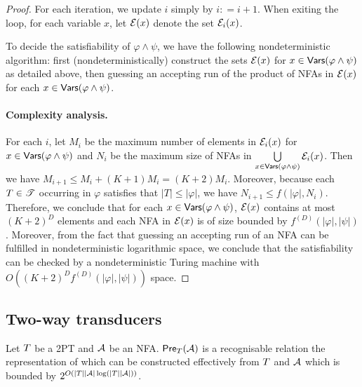 \begin{proof}
For each iteration, we update $i$ simply by  $i: = i+1$.
%
When exiting the loop, for each variable $x$, let $\mathcal{E}(x)$ denote the set $\mathcal{E}_i(x)$.

To decide the satisfiability of $\varphi \wedge \psi$, we have the following nondeterministic algorithm: first (nondeterministically) construct the sets $\mathcal{E}(x)$ for $x \in \mathsf{Vars}(\varphi \wedge \psi)$ as detailed above, then 
guessing an accepting run of the product of NFAs in $\mathcal{E}(x)$ for each $x \in \mathsf{Vars}(\varphi \wedge \psi)$.


\paragraph{Complexity analysis.} For each $i$, let $M_i$ be the maximum number of elements in $\mathcal{E}_i(x)$ for $x  \in \mathsf{Vars}(\varphi \wedge \psi)$ and $N_i$ be the maximum size of NFAs in $\bigcup \limits_{x \in \mathsf{Vars}(\varphi \wedge \psi)} \mathcal{E}_i(x)$. Then we have $M_{i+1} \le M_i + (K+1)M_i = (K+2) M_i$. Moreover,  because each $T \in \mathscr{T}$ occurring in $\varphi$ satisfies that $|T| \le |\varphi|$, we have $N_{i+1} \le f(|\varphi|, N_i)$. Therefore, we conclude that for each $x \in \mathsf{Vars}(\varphi \wedge \psi)$, $\mathcal{E}(x)$ contains at most $(K+2)^D$ elements and each NFA in $\mathcal{E}(x)$ is of size bounded by $f^{(D)}(|\varphi|, |\psi|)$. Moreover, 
from the fact that guessing an accepting run of an NFA can be fulfilled in nondeterministic logarithmic space, we conclude that the satisfiability can be checked by a nondeterministic Turing machine with %
$O((K+2)^D f^{(D)}(|\varphi|, |\psi|))$ space.
\end{proof}
 
\subsection{Two-way transducers}



\begin{lemma}\label{lem-2pt}
Let $T$ be a 2PT and $\mathcal{A}$ be an NFA. $\textsf{Pre}_{T}(\mathcal{A})$ is a recognisable relation the representation of which can be constructed effectively from $T$ and $\mathcal{A}$ which is bounded by %
$2^{O(|T||\mathcal{A}|\log (|T||\mathcal{A}|))}$.
\end{lemma}

